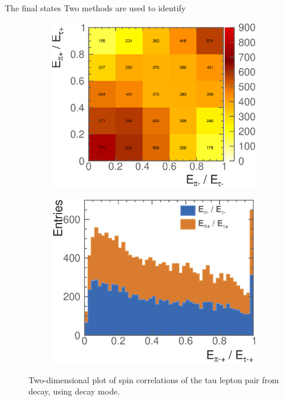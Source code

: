 The final states Two methods are used to identify



\begin{figure}[htbp]
\centering %
\begin{subfigure}[b]{0.45\textwidth}
  \includegraphics[width=\textwidth]{tau/NoTimeAnalysis/2DMC}
  \caption{}
  \label{fig:TauSpin2DMC}
\end{subfigure}
\begin{subfigure}[b]{0.45\textwidth}
  \includegraphics[width=\textwidth]{tau/NoTimeAnalysis/2Dreco}
  \caption{}
  \label{fig:TauSpin2Dreco}
\end{subfigure}
\caption[Two-dimensional plot of spin correlations of the tau lepton pair from \PZ decay, using \decayPionShort decay mode.]
{Two-dimensional plot of spin correlations of the tau lepton pair from \PZ decay, using \decayPionShort decay mode.}
\label{fig:TauSpin2D}
\end{figure}

